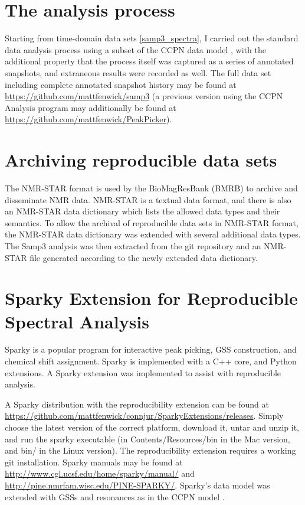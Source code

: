 \section{The analysis process}
Starting from time-domain data sets \ref{samp3_spectra}, I carried out the 
standard data analysis process using a subset of the CCPN data model \cite{ccpn}, 
with the additional property that the process itself was captured as
a series of annotated snapshots, and extraneous results were recorded as well.
The full data set including complete annotated snapshot history may be found at 
\url{https://github.com/mattfenwick/samp3}
(a previous version using the CCPN Analysis program may additionally be found
at \url{https://github.com/mattfenwick/PeakPicker}).



\section{Archiving reproducible data sets}
The NMR-STAR format is used by the BioMagResBank (BMRB) to archive and
disseminate NMR data.  NMR-STAR is a textual data format, and there is also
an NMR-STAR data dictionary which lists the allowed data types and their
semantics.  To allow the archival of reproducible data sets in NMR-STAR format,
the NMR-STAR data dictionary was extended with several additional data types.
The Samp3 analysis was then extracted from the git repository and an NMR-STAR
file generated according to the newly extended data dictionary.


\section{Sparky Extension for Reproducible Spectral Analysis}

Sparky \cite{sparky} is a popular program for interactive peak picking,
GSS construction, and chemical shift assignment.  Sparky is implemented 
with a C++ core, and Python extensions.
A Sparky extension was implemented to assist with reproducible analysis.

A Sparky distribution with the reproducibility extension can be found at
\url{https://github.com/mattfenwick/connjur/SparkyExtensions/releases}.  Simply 
choose the latest version of the correct platform, download it, untar and 
unzip it, and run the sparky executable (in Contents/Resources/bin in the
Mac version, and bin/ in the Linux version).
The reproducibility extension requires a working git installation.
Sparky manuals may be found at \url{http://www.cgl.ucsf.edu/home/sparky/manual/} 
and \url{http://pine.nmrfam.wisc.edu/PINE-SPARKY/}.
Sparky's data model was extended with GSSs and resonances as in the CCPN model \cite{ccpn}.




